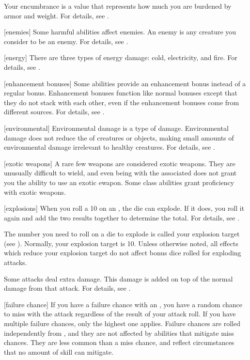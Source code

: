  Your encumbrance is a value that represents how much you are burdened by armor and weight.
For details, see .

[enemies] Some harmful abilities affect enemies.
An enemy is any creature you consider to be an enemy.
For details, see .

[energy] There are three types of energy damage: cold, electricity, and fire.
For details, see .

[enhancement bonuses] Some abilities provide an enhancement bonus instead of a regular bonus.
Enhancement bonuses function like normal bonuses except that they do not stack with each other, even if the enhancement bonuses come from different sources.
For details, see .

[environmental] Environmental damage is a type of damage.
Environmental damage does not reduce the  of creatures or objects, making small amounts of environmental damage irrelevant to healthy creatures.
For details, see .

[exotic weapons] A rare few weapons are considered exotic weapons.
They are unusually difficult to wield, and even being  with the associated  does not grant you the ability to use an exotic ewapon.
Some class abilities grant proficiency with exotic weapons.

[explosions] When you roll a 10 on an , the die can explode.
If it does, you roll it again and add the two results together to determine the total.
For details, see .

 The number you need to roll on a die to explode is called your explosion target (see ).
Normally, your explosion target is 10.
Unless otherwise noted, all effects which reduce your explosion target do not affect bonus dice rolled for exploding attacks.

 Some attacks deal extra damage.
This damage is added on top of the normal damage from that attack.
For details, see .

[failure chance] If you have a failure chance with an , you have a random chance to miss with the attack regardless of the result of your attack roll.
If you have multiple failure chances, only the highest one applies.
Failure chances are rolled independently from , and they are not affected by abilities that mitigate miss chances.
They are less common than a miss chance, and reflect circumstances that no amount of skill can mitigate.

